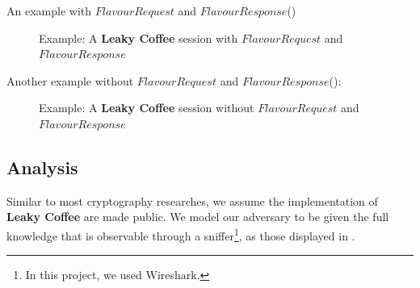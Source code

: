 \begin{example} \label{Ex: An example with $FlavourRequest$ and $FlavourResponse$}
{An example with $FlavourRequest$ and $FlavourResponse$()}

{
\begin{figure}[H]
\centering
\resizebox{7cm}{!}
{}
\caption{Example: A \textbf{Leaky Coffee} session with $FlavourRequest$ and $FlavourResponse$}
\label{Fig: Leaky-Coffee Example1}
\end{figure}
}
\end{example}

\begin{example} \label{Ex: A Leaky-Coffee session without $FlavourRequest$ and $FlavourResponse$}
{Another example without $FlavourRequest$ and $FlavourResponse$()}:

\begin{figure}[H]
\centering
\resizebox{6cm}{!}
{}
\caption{Example: A \textbf{Leaky Coffee} session without $FlavourRequest$ and $FlavourResponse$}
\label{Fig: Leaky-Coffee Example2}
\end{figure}
\end{example}

\subsection{Analysis}

Similar to most cryptography researches, we assume the implementation of \textbf{Leaky Coffee} are made public. We model our adversary to be given the full knowledge that is observable through a sniffer\footnote{In this project, we used Wireshark\cite{Wireshark}.}, as those displayed in .

